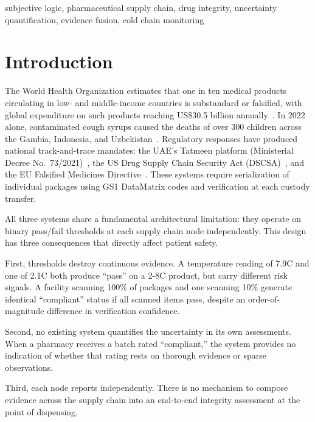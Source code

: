 \documentclass[conference]{IEEEtran}
\begin{document}
\begin{IEEEkeywords}
subjective logic, pharmaceutical supply chain, drug integrity,
uncertainty quantification, evidence fusion, cold chain monitoring
\end{IEEEkeywords}

\section{Introduction}

The World Health Organization estimates that one in ten medical products
circulating in low- and middle-income countries is substandard or
falsified, with global expenditure on such products reaching
US\$30.5 billion annually~\cite{who2024sf}. In 2022 alone, contaminated
cough syrups caused the deaths of over 300 children across the Gambia,
Indonesia, and Uzbekistan~\cite{who2023cough}. Regulatory responses
have produced national track-and-trace mandates: the UAE's Tatmeen
platform (Ministerial Decree No.~73/2021)~\cite{tatmeen_decree73},
the US Drug Supply Chain Security Act (DSCSA)~\cite{dscsa2013}, and the
EU Falsified Medicines Directive~\cite{eufmd2011}. These systems
require serialization of individual packages using GS1 DataMatrix
codes and verification at each custody transfer.

All three systems share a fundamental architectural limitation: they
operate on binary pass/fail thresholds at each supply chain node
independently. This design has three consequences that directly affect
patient safety.

First, thresholds destroy continuous evidence. A temperature reading of
7.9\textdegree C and one of 2.1\textdegree C both produce ``pass'' on a
2-8\textdegree C product, but carry different risk signals. A facility
scanning 100\% of packages and one scanning 10\% generate identical
``compliant'' status if all scanned items pass, despite an order-of-magnitude
difference in verification confidence.

Second, no existing system quantifies the uncertainty in its own
assessments. When a pharmacy receives a batch rated ``compliant,'' the
system provides no indication of whether that rating rests on thorough
evidence or sparse observations.

Third, each node reports independently. There is no mechanism to compose
evidence across the supply chain into an end-to-end integrity assessment
at the point of dispensing.
\end{document}
